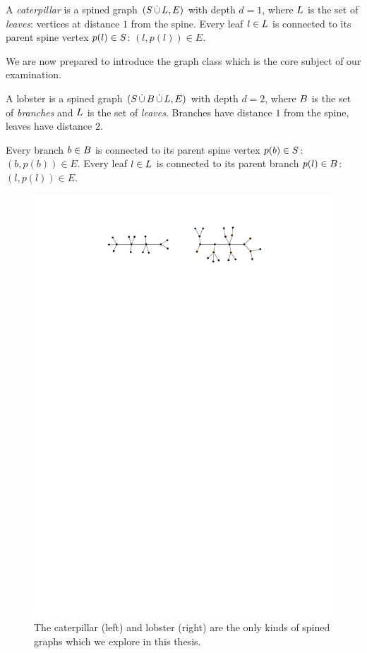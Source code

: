 A \emph{caterpillar} is a spined graph $(S \,\dot{\cup}\, L, E)$ with depth $d=1$, where $L$ is the set of \emph{leaves}: vertices at distance $1$ from the spine. Every leaf $l \in L$ is connected to its parent spine vertex $p(l) \in S$: $(l, p(l)) \in E$.

We are now prepared to introduce the graph class which is the core subject of our examination.

\begin{definition}[Lobster]
A lobster is a spined graph $(S \,\dot{\cup}\, B \,\dot{\cup}\, L, E)$ with depth $d=2$, where $B$ is the set of \emph{branches} and $L$ is the set of \emph{leaves}. Branches have distance $1$ from the spine, leaves have distance $2$.

Every branch $b \in B$ is connected to its parent spine vertex $p(b) \in S$: $(b, p(b)) \in E$. Every leaf $l \in L$ is connected to its parent branch $p(l) \in B$: $(l, p(l)) \in E$.
\end{definition}

\begin{figure}[b]
    \centering
    \includegraphics{graphics/ch2_caterpillar_lobster.pdf}
    \caption[Caterpillar and lobster]{The caterpillar (left) and lobster (right) are the only kinds of spined graphs which we explore in this thesis.}
    \label{fig:ch2_caterpillar_lobster}
\end{figure}

